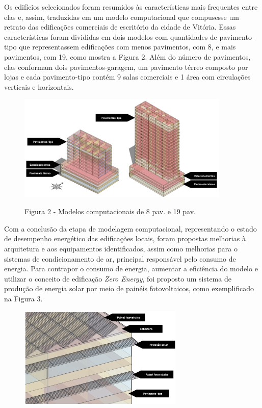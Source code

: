 \begin{onehalfspace}
    \noindent Os edifícios selecionados foram resumidos às características mais frequentes 
    entre elas e, assim, traduzidas em um modelo computacional que compusesse um retrato 
    das edificações comerciais de escritório da cidade de Vitória. Essas características 
    foram divididas em dois modelos com quantidades de pavimento-tipo que representassem 
    edificações com menos pavimentos, com 8, e mais pavimentos, com 19, como mostra a 
    Figura 2. Além do número de pavimentos, elas conformam dois pavimentos-garagem, 
    um pavimento térreo composto por lojas e cada pavimento-tipo contém 9 salas 
    comerciais e 1 área com circulações verticais e horizontais.%
    \begin{figure}[H]
        \centering
        \includegraphics[width=0.9\textwidth]{figures/fig11_8-19-2pav.png}
        \begin{center}
            \scriptsize Figura 2 - Modelos computacionais de 8 pav. e 19 pav.
        \end{center}
    \end{figure}\vspace*{-0.3cm}
    \noindent Com a conclusão da etapa de modelagem computacional, representando o estado de desempenho
    energético das edificações locais, foram propostas melhorias à arquitetura e aos equipamentos
    identificados, assim como melhorias para o sistemas de condicionamento de ar, principal
    responsável pelo consumo de energia. Para contrapor o consumo de energia, aumentar a
    eficiência do modelo e utilizar o conceito de edificação \textit{Zero Energy}, foi proposto
    um sistema de produção de energia solar por meio de painéis fotovoltaicos, como exemplificado
    na Figura 3.
    \begin{figure}[H]
        \centering
        \includegraphics[width=0.7\textwidth]{figures/paineis pv2.png}

\end{figure}
\end{onehalfspace}
